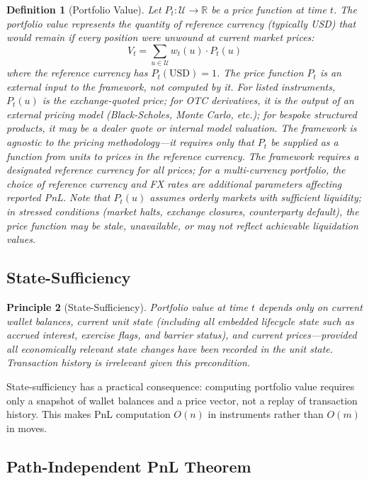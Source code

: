 \documentclass[11pt,a4paper]{article}
\newtheorem{definition}{Definition}[section]
\newtheorem{principle}[definition]{Principle}
\begin{document}
\begin{definition}[Portfolio Value]
Let $P_t : \mathcal{U} \to \mathbb{R}$ be a price function at time $t$. The portfolio value represents the quantity of reference currency (typically USD) that would remain if every position were unwound at current market prices:
\[
V_t = \sum_{u \in \mathcal{U}} w_t(u) \cdot P_t(u)
\]
where the reference currency has $P_t(\text{USD}) = 1$. The price function $P_t$ is an \emph{external input} to the framework, not computed by it. For listed instruments, $P_t(u)$ is the exchange-quoted price; for OTC derivatives, it is the output of an external pricing model (Black-Scholes, Monte Carlo, etc.); for bespoke structured products, it may be a dealer quote or internal model valuation. The framework is agnostic to the pricing methodology---it requires only that $P_t$ be supplied as a function from units to prices in the reference currency. The framework requires a designated reference currency for all prices; for a multi-currency portfolio, the choice of reference currency and FX rates are additional parameters affecting reported PnL. Note that $P_t(u)$ assumes orderly markets with sufficient liquidity; in stressed conditions (market halts, exchange closures, counterparty default), the price function may be stale, unavailable, or may not reflect achievable liquidation values.
\end{definition}

\subsection{State-Sufficiency}

\begin{principle}[State-Sufficiency]
Portfolio value at time $t$ depends only on current wallet balances, current unit state (including all embedded lifecycle state such as accrued interest, exercise flags, and barrier status), and current prices---provided all economically relevant state changes have been recorded in the unit state. Transaction history is irrelevant given this precondition.
\end{principle}

\noindent State-sufficiency has a practical consequence: computing portfolio value requires only a snapshot of wallet balances and a price vector, not a replay of transaction history. This makes PnL computation $O(n)$ in instruments rather than $O(m)$ in moves.

\subsection{Path-Independent PnL Theorem}
\end{document}
